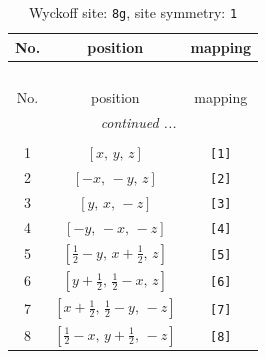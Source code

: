 \documentclass[fleqn,8pt]{jsarticle}
\begin{document}
\renewcommand{\arraystretch}{1.2}
\begin{longtable}{ccc}
\caption{Wyckoff site: {\tt 8g}, site symmetry: {\tt 1}}
 \\
 \hline \hline
No. & position & mapping \\ \hline \endfirsthead

\multicolumn{2}{l}{\tablename\ \thetable{}} \\
 \hline \hline
No. & position & mapping \\ \hline \endhead

 \hline \hline
\multicolumn{2}{r}{\footnotesize\it continued ...} \\ \endfoot

 \hline \hline
\multicolumn{2}{r}{} \\ \endlastfoot

1 & $\left[ x,\, y,\, z \right]$ & {\tt [1]} \\ \hline
2 & $\left[ - x,\, - y,\, z \right]$ & {\tt [2]} \\ \hline
3 & $\left[ y,\, x,\, - z \right]$ & {\tt [3]} \\ \hline
4 & $\left[ - y,\, - x,\, - z \right]$ & {\tt [4]} \\ \hline
5 & $\left[ \frac{1}{2} - y,\, x + \frac{1}{2},\, z \right]$ & {\tt [5]} \\ \hline
6 & $\left[ y + \frac{1}{2},\, \frac{1}{2} - x,\, z \right]$ & {\tt [6]} \\ \hline
7 & $\left[ x + \frac{1}{2},\, \frac{1}{2} - y,\, - z \right]$ & {\tt [7]} \\ \hline
8 & $\left[ \frac{1}{2} - x,\, y + \frac{1}{2},\, - z \right]$ & {\tt [8]} \\
\end{longtable}
\end{document}
